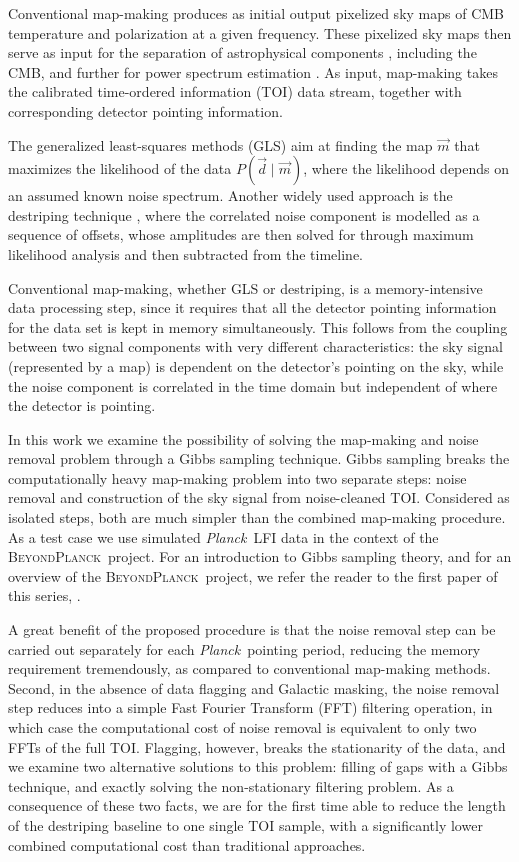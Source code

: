 \documentclass[twocolumn]{aa}
\newcommand{\ve}[1]{{\vec #1}}
\newcommand{\BP}{\textsc{BeyondPlanck}}
\def\Planck{\textit{Planck}}
\begin{document}
Conventional map-making produces as initial output pixelized sky maps
of CMB temperature and polarization at a given frequency.  These
pixelized sky maps then serve as input for the separation of
astrophysical components \citep[e.g.,][]{planck2016-l04}, including
the CMB, and further for power spectrum estimation
\citep[e.g.,][]{planck2016-l05}.  As input, map-making takes the
calibrated time-ordered information (TOI) data stream, together with
corresponding detector pointing information.

The generalized least-squares methods (GLS) aim at finding the map
$\ve m$ that maximizes the likelihood of the data ${P}(\ve d \mid \ve
m)$, where the likelihood depends on an assumed known noise spectrum.
Another widely used approach is the destriping technique
\citep{Burigana1997,delabrouille1998a, maino1999,maino2002b,
  keihanen2004, keihanen2005,Sutton09,kurki-suonio2009,keihanen2010}, where the
correlated noise component is modelled as a sequence of offsets, whose
amplitudes are then solved for through maximum likelihood analysis and
then subtracted from the timeline.

Conventional map-making, whether GLS or destriping, is a
memory-intensive data processing step, since it requires that all the
detector pointing information for the data set is kept in memory
simultaneously.  This follows from the coupling between two signal
components with very different characteristics: the sky signal
(represented by a map) is dependent on the detector's pointing on the
sky, while the noise component is correlated in the time domain but
independent of where the detector is pointing.

In this work we examine the possibility of solving the map-making and
noise removal problem through a Gibbs sampling technique.  Gibbs
sampling breaks the computationally heavy map-making problem into two separate steps:
noise removal and construction of the sky signal from noise-cleaned
TOI.  Considered as isolated steps, both are much simpler than the
combined map-making procedure.  As a test case we use simulated \Planck\ LFI
data in the context of the \BP\ project.  For an introduction to Gibbs
sampling theory, and for an overview of the \BP\ project, we refer the
reader to the first paper of this series, \cite{bp01}.

A great benefit of the proposed procedure is that the noise removal
step can be carried out separately for each \Planck\ pointing period,
reducing the memory requirement tremendously, as compared to
conventional map-making methods. Second, in the absence of data
flagging and Galactic masking, the noise removal step reduces into a
simple Fast Fourier Transform (FFT) filtering operation, in which case
the computational cost of noise removal is equivalent to only two FFTs
of the full TOI.  Flagging, however, breaks the stationarity of the
data, and we examine two alternative solutions to this problem:
filling of gaps with a Gibbs technique, and exactly solving the
non-stationary filtering problem.  As a consequence of these two
facts, we are for the first time able to reduce the length of the
destriping baseline to one single TOI sample, with a significantly
lower combined computational cost than traditional approaches.
\end{document}
